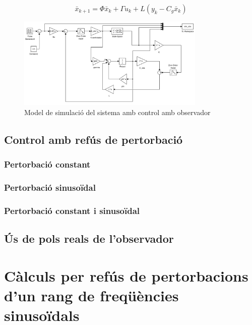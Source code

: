 \documentclass[12pt,a4paper,final,twoside,openright]{report}
\begin{document}
\begin{equation}\label{eq:obs_model}
\bar{x}_{k+1} = \Phi \bar{x}_k + \Gamma u_k + L (y_k - C_g \bar{x}_k)
\end{equation}

\begin{figure}
\centering
\includegraphics[width=0.8\textwidth]{Imatges/obs_sim_scheme.pdf}
\caption{Model de simulació del sistema amb control amb observador\label{fig:obs_sim_scheme}}
\end{figure}


\section{Control amb refús de pertorbació}

\subsection{Pertorbació constant}

\subsection{Pertorbació sinusoïdal}

\subsection{Pertorbació constant i sinusoïdal}

\section{Ús de pols reals de l'observador}

%


\appendix
\clearpage %
\addappheadtotoc
\appendixpage

\chapter{Càlculs per refús de pertorbacions d'un rang de freqüències sinusoïdals}
\end{document}
